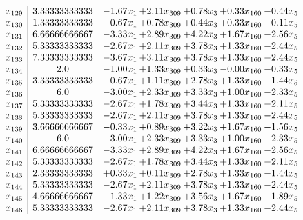 \documentclass[8pt]{article}
\begin{document}
\[\begin{array}{c| c c@{\hskip 2pt} c@{\hskip 2pt} c@{\hskip 2pt} c@{\hskip 2pt} c@{\hskip 2pt} }
 x_{129}   &  3.33333333333 & -1.67 x_{1} & +  2.11 x_{309} & +  0.78 x_{3} & +  0.33 x_{160} & -0.44 x_{5}\\
 x_{130}   &  1.33333333333 & -0.67 x_{1} & +  0.78 x_{309} & +  0.44 x_{3} & +  0.33 x_{160} & -0.11 x_{5}\\
 x_{131}   &  6.66666666667 & -3.33 x_{1} & +  2.89 x_{309} & +  4.22 x_{3} & +  1.67 x_{160} & -2.56 x_{5}\\
 x_{132}   &  5.33333333333 & -2.67 x_{1} & +  2.11 x_{309} & +  3.78 x_{3} & +  1.33 x_{160} & -2.44 x_{5}\\
 x_{133}   &  7.33333333333 & -3.67 x_{1} & +  3.11 x_{309} & +  3.78 x_{3} & +  1.33 x_{160} & -2.44 x_{5}\\
 x_{134}   &  2.0 & -1.00 x_{1} & +  1.33 x_{309} & +  0.33 x_{3} & -0.00 x_{160} & -0.33 x_{5}\\
 x_{135}   &  3.33333333333 & -0.67 x_{1} & +  1.11 x_{309} & +  2.78 x_{3} & +  1.33 x_{160} & -1.44 x_{5}\\
 x_{136}   &  6.0 & -3.00 x_{1} & +  2.33 x_{309} & +  3.33 x_{3} & +  1.00 x_{160} & -2.33 x_{5}\\
 x_{137}   &  5.33333333333 & -2.67 x_{1} & +  1.78 x_{309} & +  3.44 x_{3} & +  1.33 x_{160} & -2.11 x_{5}\\
 x_{138}   &  5.33333333333 & -2.67 x_{1} & +  2.11 x_{309} & +  3.78 x_{3} & +  1.33 x_{160} & -2.44 x_{5}\\
 x_{139}   &  3.66666666667 & -0.33 x_{1} & +  0.89 x_{309} & +  3.22 x_{3} & +  1.67 x_{160} & -1.56 x_{5}\\
 x_{140}   &  6.0 & -3.00 x_{1} & +  2.33 x_{309} & +  3.33 x_{3} & +  1.00 x_{160} & -2.33 x_{5}\\
 x_{141}   &  6.66666666667 & -3.33 x_{1} & +  2.89 x_{309} & +  4.22 x_{3} & +  1.67 x_{160} & -2.56 x_{5}\\
 x_{142}   &  5.33333333333 & -2.67 x_{1} & +  1.78 x_{309} & +  3.44 x_{3} & +  1.33 x_{160} & -2.11 x_{5}\\
 x_{143}   &  2.33333333333 & +  0.33 x_{1} & +  0.11 x_{309} & +  2.78 x_{3} & +  1.33 x_{160} & -1.44 x_{5}\\
 x_{144}   &  5.33333333333 & -2.67 x_{1} & +  2.11 x_{309} & +  3.78 x_{3} & +  1.33 x_{160} & -2.44 x_{5}\\
 x_{145}   &  4.66666666667 & -1.33 x_{1} & +  1.22 x_{309} & +  3.56 x_{3} & +  1.67 x_{160} & -1.89 x_{5}\\
 x_{146}   &  5.33333333333 & -2.67 x_{1} & +  2.11 x_{309} & +  3.78 x_{3} & +  1.33 x_{160} & -2.44 x_{5}\\

\end{array}\]
\end{document}
